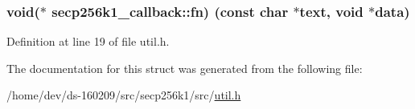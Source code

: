 \subsubsection[{fn}]{\setlength{\rightskip}{0pt plus 5cm}void($\ast$ secp256k1\+\_\+callback\+::fn) (const char $\ast$text, void $\ast${\bf data})}\label{structsecp256k1__callback_ab53dda8f586b668b302a0955de4de44c}


Definition at line 19 of file util.\+h.



The documentation for this struct was generated from the following file\+:\begin{DoxyCompactItemize}
\item 
/home/dev/ds-\/160209/src/secp256k1/src/\hyperlink{secp256k1_2src_2util_8h}{util.\+h}\end{DoxyCompactItemize}
